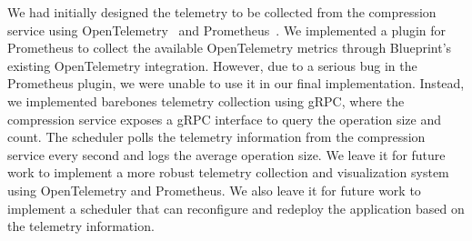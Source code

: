 We had initially designed the telemetry to be collected from the compression service using OpenTelemetry~\cite{otel} and Prometheus~\cite{prometheus}. 
We implemented a plugin for Prometheus to collect the available OpenTelemetry metrics through Blueprint's existing OpenTelemetry integration. 
However, due to a serious bug in the Prometheus plugin, we were unable to use it in our final implementation.
Instead, we implemented barebones telemetry collection using gRPC, where the compression service exposes a gRPC interface to query the operation size and count.
The scheduler polls the telemetry information from the compression service every second and logs the average operation size.
We leave it for future work to implement a more robust telemetry collection and visualization system using OpenTelemetry and Prometheus.
We also leave it for future work to implement a scheduler that can reconfigure and redeploy the application based on the telemetry information.
